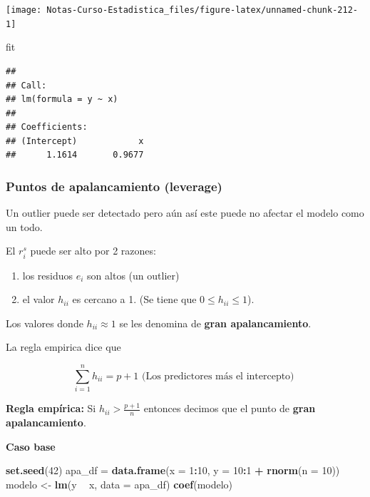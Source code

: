 \documentclass[
  12pt,
]{book}
\newenvironment{Shaded}{\begin{snugshade}}{\end{snugshade}}
\newcommand{\DataTypeTok}[1]{\textcolor[rgb]{0.13,0.29,0.53}{#1}}
\newcommand{\DecValTok}[1]{\textcolor[rgb]{0.00,0.00,0.81}{#1}}
\newcommand{\KeywordTok}[1]{\textcolor[rgb]{0.13,0.29,0.53}{\textbf{#1}}}
\newcommand{\NormalTok}[1]{#1}
\newcommand{\OperatorTok}[1]{\textcolor[rgb]{0.81,0.36,0.00}{\textbf{#1}}}
\newcommand{\StringTok}[1]{\textcolor[rgb]{0.31,0.60,0.02}{#1}}
\providecommand{\tightlist}{%
  \setlength{\itemsep}{0pt}\setlength{\parskip}{0pt}}
\theoremstyle{definition}
\theoremstyle{definition}
\theoremstyle{definition}
\theoremstyle{remark}
\begin{document}
\begin{center}\texttt{[image: Notas-Curso-Estadistica\_files/figure-latex/unnamed-chunk-212-1]} \end{center}

\begin{Shaded}
\begin{Highlighting}[]
\NormalTok{fit}
\end{Highlighting}
\end{Shaded}

\begin{verbatim}
## 
## Call:
## lm(formula = y ~ x)
## 
## Coefficients:
## (Intercept)            x  
##      1.1614       0.9677
\end{verbatim}

\hypertarget{puntos-de-apalancamiento-leverage}{%
\subsubsection{Puntos de apalancamiento (leverage)}\label{puntos-de-apalancamiento-leverage}}

Un outlier puede ser detectado pero aún así este puede no afectar el modelo como un todo.

El \(r_{i}^s\) puede ser alto por 2 razones:

\begin{enumerate}
\def\labelenumi{\arabic{enumi}.}
\tightlist
\item
  los residuos \(e_i\) son altos (un outlier)
\item
  el valor \(h_{ii}\) es cercano a 1. (Se tiene que \(0\leq h_{ii}\leq 1\)).
\end{enumerate}

Los valores donde \(h_{ii}\approx 1\) se les denomina de \textbf{gran apalancamiento}.

La regla empirica dice que

\begin{equation*}
\sum_{i=1}^{n} h_{ii} = p +1 \text{  (Los predictores más el intercepto)   }
\end{equation*}

\textbf{Regla empírica:} Si \(h_{ii}>\frac{p+1}{n}\) entonces decimos que el punto de \textbf{gran apalancamiento}.

\textbf{Caso base}

\begin{Shaded}
\begin{Highlighting}[]
\KeywordTok{set.seed}\NormalTok{(}\DecValTok{42}\NormalTok{)}
\NormalTok{apa_df =}\StringTok{ }\KeywordTok{data.frame}\NormalTok{(}\DataTypeTok{x =} \DecValTok{1}\OperatorTok{:}\DecValTok{10}\NormalTok{, }\DataTypeTok{y =} \DecValTok{10}\OperatorTok{:}\DecValTok{1} \OperatorTok{+}\StringTok{ }\KeywordTok{rnorm}\NormalTok{(}\DataTypeTok{n =} \DecValTok{10}\NormalTok{))}
\NormalTok{modelo <-}\StringTok{ }\KeywordTok{lm}\NormalTok{(y }\OperatorTok{~}\StringTok{ }\NormalTok{x, }\DataTypeTok{data =}\NormalTok{ apa_df)}
\KeywordTok{coef}\NormalTok{(modelo)}
\end{Highlighting}
\end{Shaded}
\end{document}
